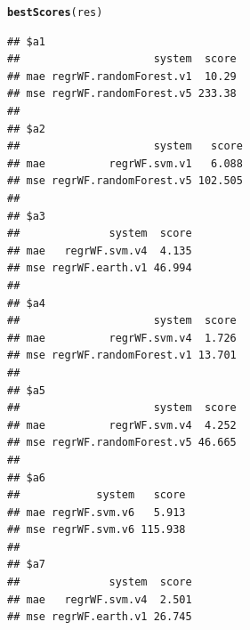 \documentclass[10pt,a4paper]{article}\usepackage[]{graphicx}\usepackage[]{color}
\makeatletter
\newcommand{\hlstd}[1]{\textcolor[rgb]{0.345,0.345,0.345}{#1}}%
\newcommand{\hlkwd}[1]{\textcolor[rgb]{0.737,0.353,0.396}{\textbf{#1}}}%
\newenvironment{kframe}{%
 \def\at@end@of@kframe{}%
 \ifinner\ifhmode%
  \def\at@end@of@kframe{\end{minipage}}%
  \begin{minipage}{\columnwidth}%
 \fi\fi%
 \def\FrameCommand##1{\hskip\@totalleftmargin \hskip-\fboxsep
 \colorbox{shadecolor}{##1}\hskip-\fboxsep
     \hskip-\linewidth \hskip-\@totalleftmargin \hskip\columnwidth}%
 \MakeFramed {\advance\hsize-\width
   \@totalleftmargin\z@ \linewidth\hsize
   \@setminipage}}%
 {\par\unskip\endMakeFramed%
 \at@end@of@kframe}
\newenvironment{knitrout}{}{} %
\makeatother
\begin{document}
\begin{knitrout}
\color{fgcolor}\begin{kframe}
\begin{alltt}
\hlkwd{bestScores}\hlstd{(res)}
\end{alltt}
\begin{verbatim}
## $a1
##                     system  score
## mae regrWF.randomForest.v1  10.29
## mse regrWF.randomForest.v5 233.38
## 
## $a2
##                     system   score
## mae          regrWF.svm.v1   6.088
## mse regrWF.randomForest.v5 102.505
## 
## $a3
##              system  score
## mae   regrWF.svm.v4  4.135
## mse regrWF.earth.v1 46.994
## 
## $a4
##                     system  score
## mae          regrWF.svm.v4  1.726
## mse regrWF.randomForest.v1 13.701
## 
## $a5
##                     system  score
## mae          regrWF.svm.v4  4.252
## mse regrWF.randomForest.v5 46.665
## 
## $a6
##            system   score
## mae regrWF.svm.v6   5.913
## mse regrWF.svm.v6 115.938
## 
## $a7
##              system  score
## mae   regrWF.svm.v4  2.501
## mse regrWF.earth.v1 26.745
\end{verbatim}
\end{kframe}
\end{knitrout}
\end{document}
